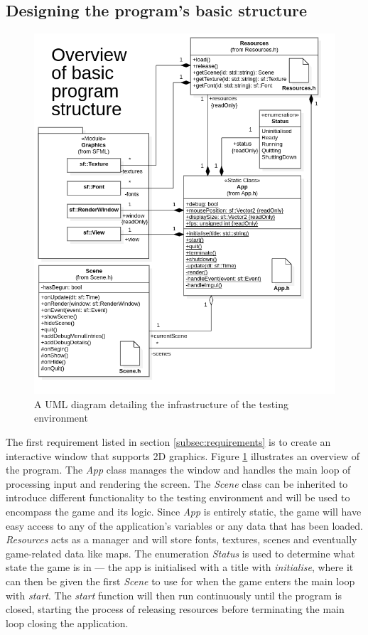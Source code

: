 \documentclass[11pt, a4paper]{report}
\begin{document}
\subsection{Designing the program's basic structure}
\label{subsec:designingProgram}

\begin{figure}[!h]
  \centering
  \includegraphics[width=\linewidth]{img/app_overview.png}
  \caption{A UML diagram detailing the infrastructure of the testing environment}
  \label{fig:foundationsUML}
\end{figure}

The first requirement listed in section \ref{subsec:requirements} is to create an interactive window that supports 2D graphics. Figure \ref{fig:foundationsUML} illustrates an overview of the program. The \emph{App} class manages the window and handles the main loop of processing input and rendering the screen. The \emph{Scene} class can be inherited to introduce different functionality to the testing environment and will be used to encompass the game and its logic. Since \emph{App} is entirely static, the game will have easy access to any of the application's variables or any data that has been loaded. \emph{Resources} acts as a manager and will store fonts, textures, scenes and eventually game-related data like maps. The enumeration \emph{Status} is used to determine what state the game is in --- the app is initialised with a title with \emph{initialise}, where it can then be given the first \emph{Scene} to use for when the game enters the main loop with \emph{start}. The \emph{start} function will then run continuously until the program is closed, starting the process of releasing resources before terminating the main loop closing the application.
\end{document}
